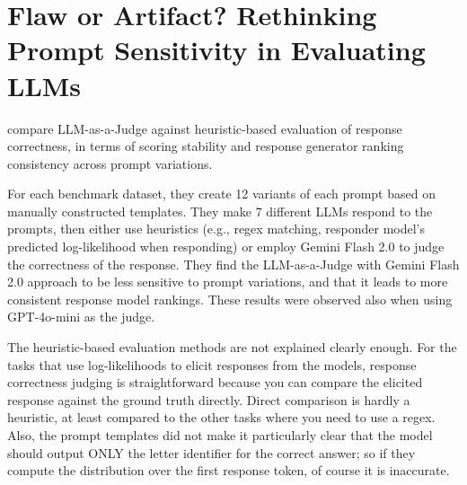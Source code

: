 \section{Flaw or Artifact? Rethinking Prompt Sensitivity in Evaluating LLMs}

\textcite{hua2025FlawArtifactRethinking} compare LLM-as-a-Judge against heuristic-based evaluation of response correctness, in terms of scoring stability and response generator ranking consistency across prompt variations. 

For each benchmark dataset, they create 12 variants of each prompt based on manually constructed templates. They make 7 different LLMs respond to the prompts, then either use heuristics (e.g., regex matching, responder model's predicted log-likelihood when responding) or employ Gemini Flash 2.0 to judge the correctness of the response. They find the LLM-as-a-Judge with Gemini Flash 2.0 approach to be less sensitive to prompt variations, and that it leads to more consistent response model rankings. These results were observed also when using GPT-4o-mini as the judge. 

The heuristic-based evaluation methods are not explained clearly enough. For the tasks that use log-likelihoods to elicit responses from the models, response correctness judging is straightforward because you can compare the elicited response against the ground truth directly. Direct comparison is hardly a heuristic, at least compared to the other tasks where you need to use a regex. Also, the prompt templates did not make it particularly clear that the model should output ONLY the letter identifier for the correct answer; so if they compute the distribution over the first response token, of course it is inaccurate.